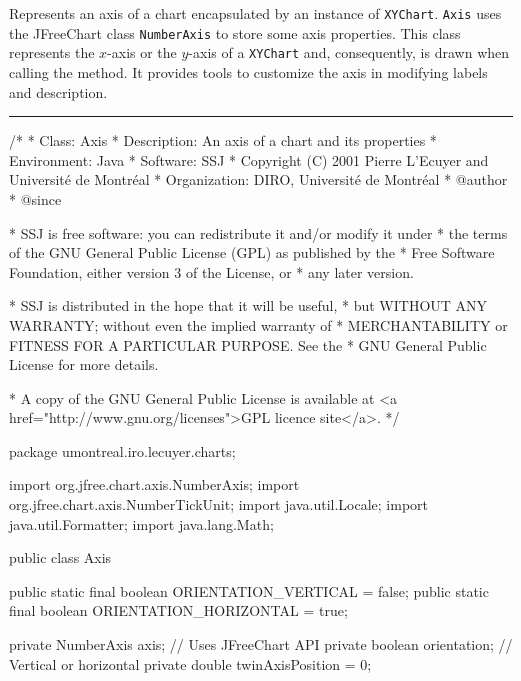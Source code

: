 
Represents an axis of a chart encapsulated by
an instance of \texttt{XYChart}.
\texttt{Axis} uses the JFreeChart class \texttt{NumberAxis}
to store some axis properties.
This class represents the $x$-axis or the $y$-axis of a \texttt{XYChart}
and, consequently,  is drawn when calling the  method.
It provides tools to customize the axis in modifying labels and description.

\bigskip\hrule
\begin{code}
\begin{hide}
/*
 * Class:        Axis
 * Description:  An axis of a chart and its properties
 * Environment:  Java
 * Software:     SSJ 
 * Copyright (C) 2001  Pierre L'Ecuyer and Université de Montréal
 * Organization: DIRO, Université de Montréal
 * @author       
 * @since

 * SSJ is free software: you can redistribute it and/or modify it under
 * the terms of the GNU General Public License (GPL) as published by the
 * Free Software Foundation, either version 3 of the License, or
 * any later version.

 * SSJ is distributed in the hope that it will be useful,
 * but WITHOUT ANY WARRANTY; without even the implied warranty of
 * MERCHANTABILITY or FITNESS FOR A PARTICULAR PURPOSE.  See the
 * GNU General Public License for more details.

 * A copy of the GNU General Public License is available at
   <a href="http://www.gnu.org/licenses">GPL licence site</a>.
 */
\end{hide}
package umontreal.iro.lecuyer.charts;\begin{hide}

import org.jfree.chart.axis.NumberAxis;
import org.jfree.chart.axis.NumberTickUnit;
import java.util.Locale;
import java.util.Formatter;
import java.lang.Math;\end{hide}


public class Axis \begin{hide} {
   \end{hide}

   public static final boolean ORIENTATION_VERTICAL = false;
   public static final boolean ORIENTATION_HORIZONTAL = true;\begin{hide}

   private NumberAxis axis;        // Uses JFreeChart API
   private boolean orientation;    // Vertical or horizontal
   private double twinAxisPosition = 0;


\end{hide}
\end{code}
